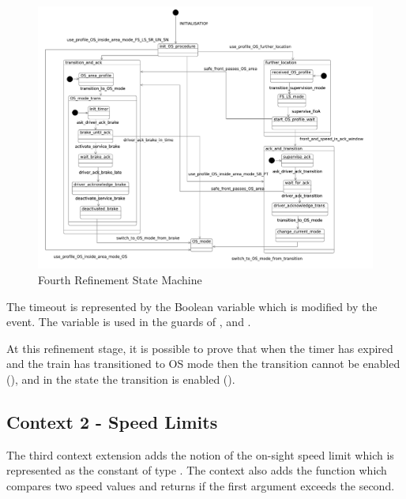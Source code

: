 \documentclass{template/openetcs_article}
\begin{document}
\begin{figure}[ht]
  \centering
  \includegraphics[width=.95\textwidth]{m4_timeout_on_sight_procedure}
  \caption{Fourth Refinement State Machine}
  \label{fig:fourth-refinement-state-machine}
\end{figure}

The timeout is represented by the Boolean variable  which
is modified by the  event. The variable is used in the
guards of ,
 and .

At this refinement stage, it is possible to prove that when the timer has
expired and the train has transitioned to OS mode then the transition
 cannot be enabled (), and in
the state  the transition
 is enabled ().

{\footnotesize

}

\subsection{Context 2 - Speed Limits}
\label{sec:context-2-speed}

The third context extension adds the notion of the on-sight speed limit which is
represented as the constant  of type
. The context also adds the function 
which compares two speed values and returns  if the first argument
exceeds the second.
\end{document}
